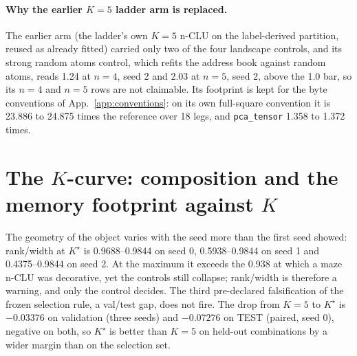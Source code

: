 \documentclass{article} %
\newcommand{\Kstar}{\ensuremath{K^{\star}}}
\begin{document}
\paragraph{Why the earlier $K=5$ ladder arm is replaced.} The earlier arm (the ladder's own
$K=5$ n-CLU on the label-derived partition, reused as already fitted) carried only two of the four
landscape controls, and its strong random atoms control, which refits the address book
against random atoms, reads 1.24 at $n=4$, seed 2 and 2.03 at $n=5$, seed 2, above the 1.0 bar, so %
its $n=4$ and $n=5$ rows are not claimable. Its footprint is kept for the byte conventions of
App.~\ref{app:conventions}: on its own full-square convention it is 23.886 to 24.875 times the %
reference over 18 legs, and \texttt{pca\_tensor} 1.358 to 1.372 times. %
\section{The $K$-curve: composition and the memory footprint against $K$}
\label{app:kcurve}

The geometry of the object varies with the seed more than the first seed showed:
rank/width at $\Kstar$ is 0.9688--0.9844 on seed 0, 0.5938--0.9844 on seed 1 and
0.4375--0.9844 on seed 2. At the maximum it exceeds the 0.938 at which a maze n-CLU was
decorative, yet the controls still collapse; rank/width is therefore a warning, and only the
control decides. %
The third pre-declared falsification of the frozen selection rule, a val/test gap, does not fire.
The drop from $K=5$ to $\Kstar$ is $-0.03376$ on validation (three seeds) and $-0.07276$ on
TEST (paired, seed 0), negative on both, so $\Kstar$ is better than $K=5$ on held-out combinations
by a wider margin than on the selection set. %
\end{document}

